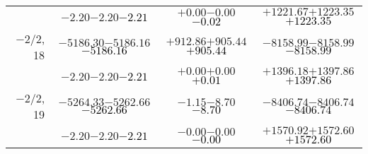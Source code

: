 \documentclass[compress]{beamer}
\begin{document}
\begin{frame}
{\begin{tabular}{r | c | c | c}
           & $-2.20$\hspace{0.1 cm}$-2.20$\hspace{0.1 cm}\textcolor{black}{$-2.21$} & $+0.00$\hspace{0.1 cm}$-0.00$\hspace{0.1 cm}\textcolor{black}{$-0.02$} & $+1221.67$\hspace{0.1 cm}$+1223.35$\hspace{0.1 cm}\textcolor{black}{$+1223.35$} \\
$-$2/2, 18 & $-5186.30$\hspace{0.1 cm}$-5186.16$\hspace{0.1 cm}\textcolor{black}{$-5186.16$} & $+912.86$\hspace{0.1 cm}$+905.44$\hspace{0.1 cm}\textcolor{black}{$+905.44$} & $-8158.99$\hspace{0.1 cm}$-8158.99$\hspace{0.1 cm}\textcolor{black}{$-8158.99$} \\
           & $-2.20$\hspace{0.1 cm}$-2.20$\hspace{0.1 cm}\textcolor{black}{$-2.21$} & $+0.00$\hspace{0.1 cm}$+0.00$\hspace{0.1 cm}\textcolor{black}{$+0.01$} & $+1396.18$\hspace{0.1 cm}$+1397.86$\hspace{0.1 cm}\textcolor{black}{$+1397.86$} \\
$-$2/2, 19 & $-5264.33$\hspace{0.1 cm}$-5262.66$\hspace{0.1 cm}\textcolor{black}{$-5262.66$} & $-1.15$\hspace{0.1 cm}$-8.70$\hspace{0.1 cm}\textcolor{black}{$-8.70$} & $-8406.74$\hspace{0.1 cm}$-8406.74$\hspace{0.1 cm}\textcolor{black}{$-8406.74$} \\
           & $-2.20$\hspace{0.1 cm}$-2.20$\hspace{0.1 cm}\textcolor{black}{$-2.21$} & $-0.00$\hspace{0.1 cm}$-0.00$\hspace{0.1 cm}\textcolor{black}{$-0.00$} & $+1570.92$\hspace{0.1 cm}$+1572.60$\hspace{0.1 cm}\textcolor{black}{$+1572.60$} \\

\end{tabular}}
\end{frame}
\end{document}
